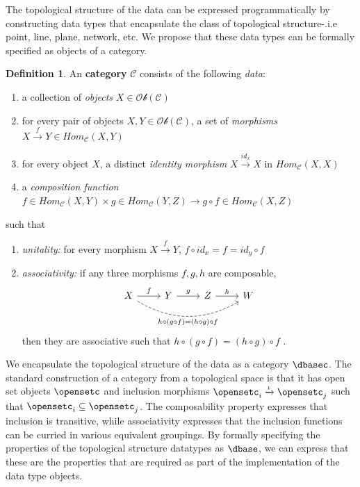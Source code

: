 \documentclass[10pt,journal,compsoc]{IEEEtran}
\theoremstyle{definition}
\newtheorem{definition}{Definition}[section]
\theoremstyle{remark}
\begin{document}
The topological structure of the data can be expressed programmatically by constructing data types that encapsulate the class of topological structure-.i.e point, line, plane, network, etc. We propose that these data types can be formally specified as objects of a category. 
\begin{definition} 
   An \textbf{category} $\mathcal{C}$ consists of the following \textit{data}: 
\begin{enumerate}
  \item a collection of \textit{objects} $X \in \mathcal{Ob}(\mathcal{C})$
  \item for every pair of objects $X, Y \in \mathcal{Ob}(\mathcal{C})$, a set of \textit{morphisms} $X \xrightarrow{f} Y \in Hom_{\mathcal{C}}(X, Y)$
  \item for every object $X$, a distinct \textit{identity morphism} $X \xrightarrow {id_x} X$ in $Hom_{\mathcal{C}}(X, X)$
  \item a \textit{composition function} $f \in Hom_{\mathcal{C}}(X, Y) \times  g \in Hom_{\mathcal{C}}(Y, Z) \rightarrow g \circ f \in Hom_{\mathcal{C}}(X, Z)$
\end{enumerate}
such that 
\begin{enumerate}
  \item \textit{unitality:} for every morphism $ X \xrightarrow{f} Y$, $f \circ id_x = f = id_y \circ f$
  \item \textit{associativity:} if any three morphisms $f, g, h$ are composable, 
    \begin{equation*}
      \begin{tikzcd}
        X \arrow[r, "f"] \arrow[rrr, "h\circ(g\circ f) = (h\circ g)\circ f"', bend right, dashed] & Y  \arrow[r, "g"] & Z \arrow[r, "h"] & W
        \end{tikzcd}
  \end{equation*}
  then they are associative such that $h\circ(g\circ f) = (h \circ g) \circ f$  \cite{lawvere2009conceptual,riehlCategoryTheoryContext,maclaneCategoriesWorkingMathematician2013,fongInvitationAppliedCategory2019}. 
  \end{enumerate}
\end{definition}

We encapsulate the topological structure of the data as a category $\mathcal{\dbasec}$. The standard construction of a category from a topological space is that it has open set objects $\opensetc$ and inclusion morphisms $\opensetc_i \xrightarrow{\iota} \opensetc_j$ such that $\opensetc_i \subseteq \opensetc_j$\cite{riehlCategoryTheoryContext}. The composability property expresses that inclusion is transitive, while associativity expresses that the inclusion functions can be curried in various equivalent groupings. By formally specifying the properties of the topological structure datatypes as $\mathcal{\dbase}$, we can express that these are the properties that are required as part of the implementation of the data type objects.  
\end{document}
